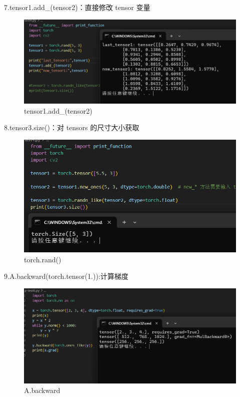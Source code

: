 \documentclass[a4paper, 12pt]{article}
\begin{document}
7.tensor1.add\_(tensor2)：直接修改 tensor 变量
\begin{figure}[H]
  \centering
  \includegraphics[width=\textwidth]{屏幕截图 2024-09-15 104649.png}
  \caption{tensor1.add\_(tensor2)}
\end{figure}

8.tensor3.size()：对 tensors 的尺寸大小获取 
\begin{figure}[H]
  \centering
  \includegraphics[width=\textwidth]{屏幕截图 2024-09-15 104310.png}
  \caption{torch.rand()}
\end{figure}

9.A.backward(torch.tensor(1.)):计算梯度
\begin{figure}[H]
  \centering
  \includegraphics[width=\textwidth]{屏幕截图 2024-09-15 111829.png}
  \caption{A.backward}
\end{figure}
\end{document}
